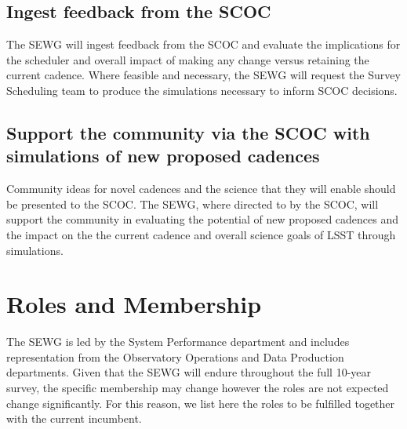\documentclass[OPS,authoryear,toc]{lsstdoc}
\begin{document}
\subsection{Ingest feedback from the SCOC}
The SEWG will  ingest feedback from the SCOC and evaluate the implications for the scheduler and overall impact of making any change versus retaining the current cadence. Where feasible and necessary, the SEWG will request the Survey Scheduling team to produce the simulations necessary to inform SCOC decisions. 

\subsection{Support the community via the SCOC with simulations of new proposed cadences}
Community ideas for novel cadences and the science that they will enable should be presented to the SCOC. 
The SEWG, where directed to by the SCOC, will support the community in evaluating the potential of new proposed cadences and the impact on the the current cadence and overall science goals of LSST through simulations. 

\section{Roles and Membership}
The SEWG is led by the System Performance department and includes representation from the Observatory Operations and Data Production departments. 
Given that the SEWG will endure throughout the full 10-year survey,  the specific membership may change however the roles are not expected change significantly. 
For this reason, we list here the roles to be fulfilled together with the current incumbent. 
\end{document}

